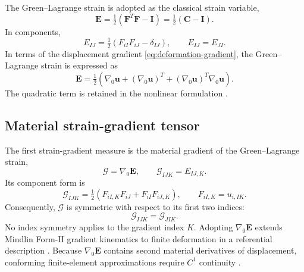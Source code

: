 \documentclass[preprint,12pt]{elsarticle}
\begin{document}
The Green--Lagrange strain is adopted as the classical strain variable,
\begin{equation}
 \mathbf{E}=\tfrac{1}{2}\left(\mathbf{F}^{T}\mathbf{F}-\mathbf{I}\right)
 =\tfrac{1}{2}\left(\mathbf{C}-\mathbf{I}\right).
 \label{eq:green-lagrange-strain}
\end{equation}
In components,
\begin{equation}
 E_{IJ}=\tfrac{1}{2}\left(F_{iI}F_{iJ}-\delta_{IJ}\right),
 \qquad E_{IJ}=E_{JI}.
 \label{eq:green-lagrange-strain-components}
\end{equation}
In terms of the displacement gradient \eqref{eq:deformation-gradient}, the
Green--Lagrange strain is expressed as
\begin{equation}
 \mathbf{E}=\tfrac{1}{2}\left(\nabla_0\mathbf{u}
 +(\nabla_0\mathbf{u})^{T}
 +(\nabla_0\mathbf{u})^{T}\nabla_0\mathbf{u}\right).
 \label{eq:green-lagrange-strain-displacement}
\end{equation}
The quadratic term is retained in the nonlinear formulation
\cite{Holzapfel2000,Ogden1997,SimoHughes1998}.

\subsection{Material strain-gradient tensor}
\label{sec:material-strain-gradient}

The first strain-gradient measure is the material gradient of the
Green--Lagrange strain,
\begin{equation}
 \bm{\mathcal{G}}=\nabla_0\mathbf{E},
 \qquad
 \mathcal{G}_{IJK}=E_{IJ,K}.
 \label{eq:material-strain-gradient}
\end{equation}
Its component form is
\begin{equation}
 \mathcal{G}_{IJK}
 =\tfrac{1}{2}\left(F_{iI,K}F_{iJ}+F_{iI}F_{iJ,K}\right),
 \qquad F_{iI,K}=u_{i,IK}.
 \label{eq:material-strain-gradient-components}
\end{equation}
Consequently, $\bm{\mathcal{G}}$ is symmetric with respect to its first two
indices:
\begin{equation}
 \mathcal{G}_{IJK}=\mathcal{G}_{JIK}.
 \label{eq:material-strain-gradient-symmetry}
\end{equation}
No index symmetry applies to the gradient index $K$. Adopting
$\nabla_0\mathbf{E}$ extends Mindlin Form-II gradient kinematics to finite
deformation in a referential description
\cite{MindlinEshel1968,AbaliMullerEremeyev2015}. Because $\nabla_0\mathbf{E}$
contains second material derivatives of displacement, conforming
finite-element approximations require $C^1$ continuity
\cite{ShuKingFleck1999}.
\end{document}
